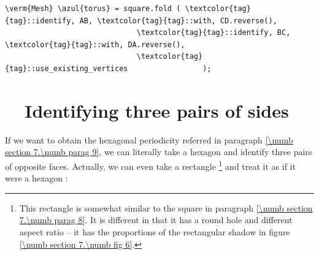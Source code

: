 \begin{Verbatim}[commandchars=\\\{\},formatcom=\small\tt,frame=single,
   label=parag-\ref{\numb section 7.\numb parag 15}.cpp,rulecolor=\color{coment},
   baselinestretch=0.94,framesep=2mm                                             ]
   \verm{Mesh} \azul{torus} = square.fold ( \textcolor{tag}{tag}::identify, AB, \textcolor{tag}{tag}::with, CD.reverse(),
                              \textcolor{tag}{tag}::identify, BC, \textcolor{tag}{tag}::with, DA.reverse(),
                              \textcolor{tag}{tag}::use_existing_vertices                 );
\end{Verbatim}


\section{~~Identifying three pairs of sides}\label{\numb section 7.\numb parag 16}

If we want to obtain the hexagonal periodicity referred in paragraph
\ref{\numb section 7.\numb parag 9}, we can literally take a hexagon and
identify three pairs of opposite faces.
Actually, we can even take a rectangle%
\footnote{This rectangle is somewhat similar to the square in paragraph
\ref{\numb section 7.\numb parag 8}.
It is different in that it has a round hole and different aspect ratio --
it has the proportions of the rectangular shadow in figure \ref{\numb section 7.\numb fig 6}.}
and treat it as if it were a hexagon :

